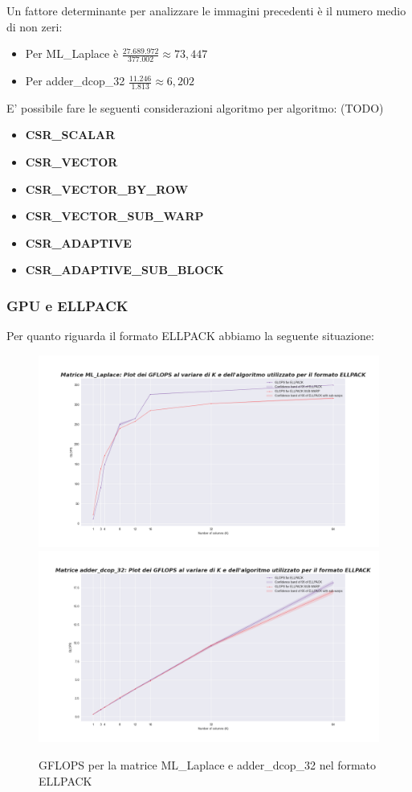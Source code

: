 \documentclass{article}
\begin{document}
Un fattore determinante per analizzare le immagini precedenti è il numero medio di non zeri:
    \begin{itemize}
        \item  Per ML\_Laplace è $\frac{27.689.972}{377.002} \approx  73,447$
        \item Per adder\_dcop\_32 $\frac{11.246}{1.813} \approx 6,202$
    \end{itemize} 
    
E' possibile fare le seguenti considerazioni algoritmo per algoritmo:
(TODO)
\begin{itemize}
    \item \textbf{CSR\_SCALAR}
    \item \textbf{CSR\_VECTOR}
    \item \textbf{CSR\_VECTOR\_BY\_ROW}
    \item \textbf{CSR\_VECTOR\_SUB\_WARP}
    \item \textbf{CSR\_ADAPTIVE}
    \item \textbf{CSR\_ADAPTIVE\_SUB\_BLOCK}
\end{itemize}

\subsubsection{GPU e ELLPACK}
Per quanto riguarda il formato ELLPACK abbiamo la seguente situazione:
\begin{figure}[H]
\centering
\includegraphics[width=\textwidth]{Immagini/ELLPACK_GPU_ML_Laplace.png}
\includegraphics[width=\textwidth]{Immagini/ELLPACK_GPU_adder_dcop_32.png}
\caption{GFLOPS per la matrice ML\_Laplace e adder\_dcop\_32 nel formato ELLPACK}
\end{figure}
\end{document}
